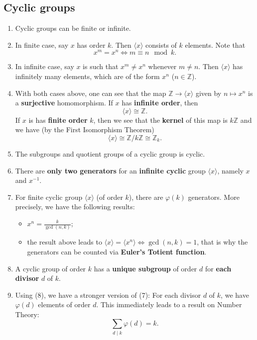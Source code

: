 \subsection*{Cyclic groups}
\begin{enumerate}[(1)]
	\item Cyclic groups can be finite or infinite.
	\item In finite case, say $x$ has order $k$. Then $\langle x\rangle$ consists of $k$ elements.  Note that
	\begin{equation*}
		x^m = x^n \Leftrightarrow m\equiv n\mod k.
	\end{equation*}
	\item In infinite case, say $x$ is such that $x^m\neq x^n$ whenever $m\neq n$. Then $\langle x\rangle$ has infinitely many elements, which are of the form $x^n$ ($n\in\mathbb{Z}$).
	\item With both cases above, one can see that the map $\mathbb{Z}\rightarrow \langle x\rangle$ given by $n\mapsto x^n$ is a \textbf{surjective} homomorphism. If $x$ has \textbf{infinite order}, then
	\begin{equation*}
		\langle x\rangle\cong \mathbb{Z}.
	\end{equation*}
	If $x$ is has \textbf{finite order} $k$, then we see that the \textbf{kernel} of this map is $k\mathbb{Z}$ and we have (by the First Isomorphism Theorem)
	\begin{equation*}
		\langle x\rangle \cong \mathbb{Z}/k\mathbb{Z} \cong \mathbb{Z}_k.
	\end{equation*}
	\item The subgroups and quotient groups of a cyclic group is cyclic.
	\item There are \textbf{only two generators} for an \textbf{infinite cyclic} group $\langle x\rangle$, namely $x$ and $x^{-1}$.
	\item For finite cyclic group $\langle x\rangle$ (of order $k$), there are $\varphi(k)$ generators. More precisely, we have the following results:
	\begin{itemize}
		\item $x^n = \frac{k}{\gcd(n,k)}$;
		\item the result above leads to $\langle x\rangle = \langle x^n \rangle \Leftrightarrow \gcd(n,k) =1$, that is why the generators can be counted via \textbf{Euler's Totient function}.
	\end{itemize}
	\item A cyclic group of order $k$
	has a \textbf{unique subgroup} of order $d$ for \textbf{each divisor} $d$ of $k$.
	\item Using (8), we have a stronger version of (7): For each divisor $d$ of $k$, we have $\varphi(d)$ elements of order $d$. This immediately leads to a result on Number Theory:
	$$\sum_{d\mid k}\varphi(d) = k.$$
\end{enumerate}
